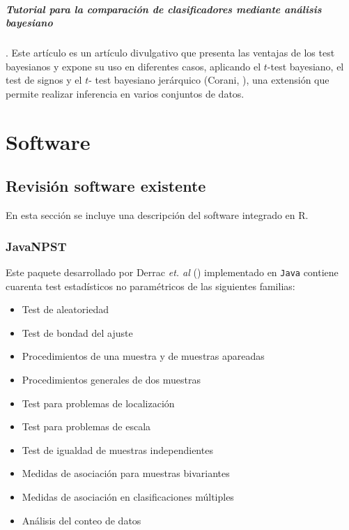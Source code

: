 \paragraph{Tutorial para la comparación de clasificadores 
mediante análisis bayesiano}. \cite{DBLP:journals/corr/BenavoliCDZ16} Este artículo 
es un artículo divulgativo que presenta las ventajas de los 
test bayesianos y expone su uso en diferentes casos, 
aplicando el $t$-test bayesiano, el test de signos y el $t$-
test bayesiano jerárquico (Corani, \cite{coranistatistical}), una extensión que permite realizar 
inferencia en varios conjuntos de datos.

\chapter{Software}
\label{chapter:software}

\section{Revisión software existente}

	En esta sección se incluye una descripción del software 
integrado en R.

\subsection*{JavaNPST}
	 
	Este paquete desarrollado por Derrac \textit{et. al} 
(\cite{2015arXiv150104222D}) implementado en \texttt{Java} 
contiene cuarenta test estadísticos no paramétricos de las 
siguientes familias:
\begin{itemize}
	\item Test de aleatoriedad
	\item Test de bondad del ajuste
	\item Procedimientos de una muestra y de muestras
		 apareadas
	\item Procedimientos generales de dos muestras
	\item Test para problemas de localización
	\item Test para problemas de escala
	\item Test de igualdad de muestras independientes
	\item Medidas de asociación para muestras bivariantes
	\item Medidas de asociación en clasificaciones múltiples
	\item Análisis del conteo de datos
\end{itemize}
	
